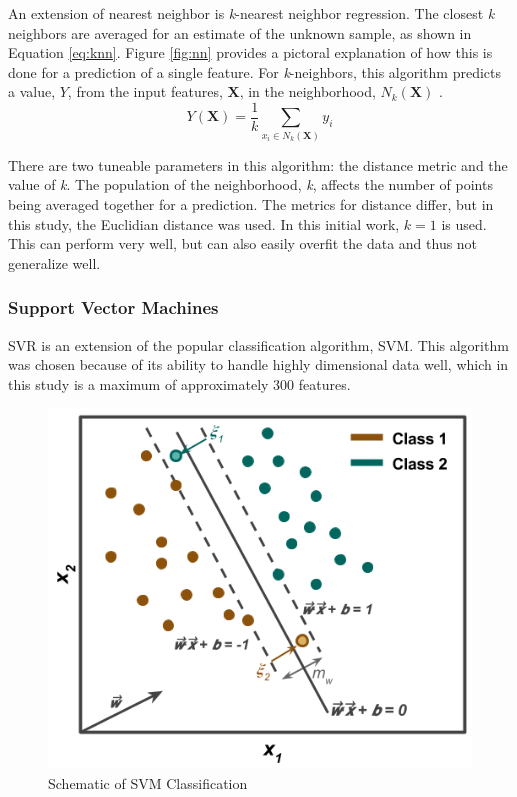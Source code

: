 An extension of nearest neighbor is \textit{k}-nearest neighbor regression.
The closest \textit{k} neighbors are averaged for an estimate of the unknown
sample, as shown in Equation \ref{eq:knn}.  Figure \ref{fig:nn} provides a
pictoral explanation of how this is done for a prediction of a single feature.
For \textit{k}-neighbors, this algorithm predicts a value, $Y$, from the input
features, $\boldsymbol{X}$, in the neighborhood, $N_k (\boldsymbol{X})$
\cite{elements_stats}. 
\begin{equation}
  Y(\boldsymbol{X}) = \frac{1}{k} \sum_{x_i \in N_k(\boldsymbol{X})} y_i
  \label{eq:knn}
\end{equation}

There are two tuneable parameters in this algorithm: the distance metric and
the value of \textit{k}.  The population of the neighborhood, \textit{k},
affects the number of points being averaged together for a prediction.  The
metrics for distance differ, but in this study, the Euclidian distance was
used. In this initial work, $k = 1$ is used. This can perform very well, but
can also easily overfit the data and thus not generalize well. 

\subsubsection{Support Vector Machines}
\label{sec:svm}

\Acrfull{SVR} is an extension of the popular classification algorithm, \acrfull{SVM}.
This algorithm was chosen because of its ability to handle highly dimensional
data well, which in this study is a maximum of approximately 300 features. 

\begin{figure}[!htb]
  \centering
  \includegraphics[width=0.8\linewidth]{./chapters/litrev/svm.png}
  \caption{Schematic of SVM Classification}
  \label{fig:svm}
\end{figure}


